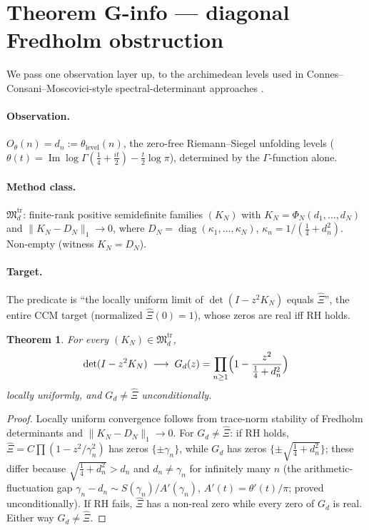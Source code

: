 \documentclass[11pt]{article}
\theoremstyle{plain}
\newtheorem{theorem}{Theorem}
\theoremstyle{definition}
\theoremstyle{remark}
\newcommand{\Xihat}{\widehat{\Xi}}
\newcommand{\Md}{\mathfrak{M}}
\begin{document}
\section{Theorem G-info --- diagonal Fredholm obstruction}\label{sec:Ginfo}

We pass one observation layer up, to the archimedean levels used in
Connes--Consani--Moscovici-style spectral-determinant approaches \cite{CCM2025}.

\paragraph{Observation.} $O_\theta(n)=d_n:=\theta_{\mathrm{level}}(n)$, the zero-free
Riemann--Siegel unfolding levels
($\theta(t)=\operatorname{Im}\log\Gamma(\tfrac14+\tfrac{it}{2})-\tfrac{t}{2}\log\pi$), determined by the
$\Gamma$-function alone.
\paragraph{Method class.} $\Md_d^{\mathrm{tr}}$: finite-rank positive semidefinite families
$(K_N)$ with $K_N=\Phi_N(d_1,\dots,d_N)$ and $\|K_N-D_N\|_1\to 0$, where
$D_N=\operatorname{diag}(\kappa_1,\dots,\kappa_N)$, $\kappa_n=1/(\tfrac14+d_n^2)$. Non-empty
(witness $K_N=D_N$).
\paragraph{Target.} The predicate is ``the locally uniform limit of $\det(I-z^2K_N)$ equals
$\Xihat$'', the entire CCM target (normalized $\Xihat(0)=1$), whose zeros are real iff RH holds.

\begin{theorem}\label{thm:Ginfo}
For every $(K_N)\in\Md_d^{\mathrm{tr}}$,
\[
  \det(I-z^2K_N)\;\longrightarrow\;G_d(z)=\prod_{n\ge 1}\Bigl(1-\frac{z^2}{\tfrac14+d_n^2}\Bigr)
\]
locally uniformly, and $G_d\neq\Xihat$ unconditionally.
\end{theorem}
\begin{proof}
Locally uniform convergence follows from trace-norm stability of Fredholm determinants and
$\|K_N-D_N\|_1\to 0$. For $G_d\neq\Xihat$: if RH holds, $\Xihat=C\prod(1-z^2/\gamma_n^2)$ has
zeros $\{\pm\gamma_n\}$, while $G_d$ has zeros $\{\pm\sqrt{\tfrac14+d_n^2}\}$; these differ
because $\sqrt{\tfrac14+d_n^2}>d_n$ and $d_n\neq\gamma_n$ for infinitely many $n$ (the
arithmetic-fluctuation gap $\gamma_n-d_n\sim S(\gamma_n)/A'(\gamma_n)$, $A'(t)=\theta'(t)/\pi$;
proved unconditionally). If RH fails, $\Xihat$ has a non-real zero while every zero of $G_d$ is
real. Either way $G_d\neq\Xihat$.
\end{proof}
\end{document}

